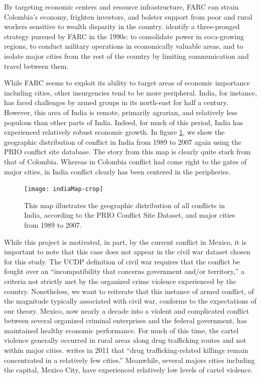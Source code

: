 By targeting economic centers and resource infrastructure, FARC can strain Colombia's economy, frighten investors, and bolster support from poor and rural workers sensitive to wealth disparity in the country. \citet{rabasa:chalk:2001} identify a three-pronged strategy pursued by FARC in the 1990s: to consolidate power in coca-growing regions, to conduct military operations in economically valuable areas, and to isolate major cities from the rest of the country by limiting communication and travel between them.  

While FARC seems to exploit its ability to target areas of economic importance including cities, other insurgencies tend to be more peripheral. India, for instance, has faced challenges by armed groups in its north-east for half a century. However, this area of India is remote, primarily agrarian, and relatively less populous than other parts of India. Indeed, for much of this period, India has experienced relatively robust economic growth. In figure \ref{fig:indiaMap}, we show the geographic distribution of conflict in India from 1989 to 2007 again using the PRIO conflict site database. The story from this map is clearly quite stark from that of Colombia. Whereas in Colombia conflict had come right to the gates of major cities, in India conflict clearly has been centered in the peripheries.

\begin{figure}[ht]
	\centering
	\texttt{[image: indiaMap-crop]}
	\caption{This map illustrates the geographic distribution of all conflicts in India, according to the PRIO Conflict Site Dataset, and major cities from 1989 to 2007. }
	\label{fig:indiaMap}
\end{figure}

While this project is motivated, in part, by the current conflict in Mexico, it is important to note that this case does not appear in the civil war dataset chosen for this study. The UCDP definition of civil war requires that the conflict be fought over an ``incompatibility that concerns government and/or territory,'' a criteria not strictly met by the organized crime violence experienced by the country. Nonetheless, we want to reiterate that this instance of armed conflict, of the magnitude typically associated with civil war, conforms to the expectations of our theory. Mexico, now nearly a decade into a violent and complicated conflict between several organized criminal enterprises and the federal government, has maintained healthy economic performance. For much of this time, the cartel violence generally occurred in rural areas along drug trafficking routes and not within major cities. \citet{beittel:2011} writes in 2011 that ``drug trafficking-related killings remain concentrated in a relatively few cities.'' Meanwhile, several majors cities including the capital, Mexico City, have experienced relatively low levels of cartel violence.

